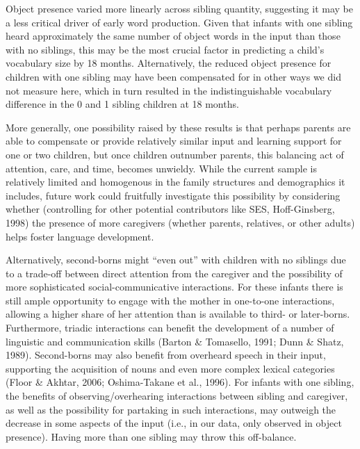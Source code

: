 \documentclass[
  english,
  man,floatsintext]{apa6}
\begin{document}
Object presence varied more linearly across sibling quantity, suggesting it may be a less critical driver of early word production. Given that infants with one sibling heard approximately the same number of object words in the input than those with no siblings, this may be the most crucial factor in predicting a child's vocabulary size by 18 months. Alternatively, the reduced object presence for children with one sibling may have been compensated for in other ways we did not measure here, which in turn resulted in the indistinguishable vocabulary difference in the 0 and 1 sibling children at 18 months.

More generally, one possibility raised by these results is that perhaps parents are able to compensate or provide relatively similar input and learning support for one or two children, but once children outnumber parents, this balancing act of attention, care, and time, becomes unwieldy. While the current sample is relatively limited and homogenous in the family structures and demographics it includes, future work could fruitfully investigate this possibility by considering whether (controlling for other potential contributors like SES, Hoff-Ginsberg, 1998) the presence of more caregivers (whether parents, relatives, or other adults) helps foster language development.

Alternatively, second-borns might \enquote{even out} with children with no siblings due to a trade-off between direct attention from the caregiver and the possibility of more sophisticated social-communicative interactions. For these infants there is still ample opportunity to engage with the mother in one-to-one interactions, allowing a higher share of her attention than is available to third- or later-borns. Furthermore, triadic interactions can benefit the development of a number of linguistic and communication skills (Barton \& Tomasello, 1991; Dunn \& Shatz, 1989). Second-borns may also benefit from overheard speech in their input, supporting the acquisition of nouns and even more complex lexical categories (Floor \& Akhtar, 2006; Oshima-Takane et al., 1996). For infants with one sibling, the benefits of observing/overhearing interactions between sibling and caregiver, as well as the possibility for partaking in such interactions, may outweigh the decrease in some aspects of the input (i.e., in our data, only observed in object presence). Having more than one sibling may throw this off-balance.
\end{document}
